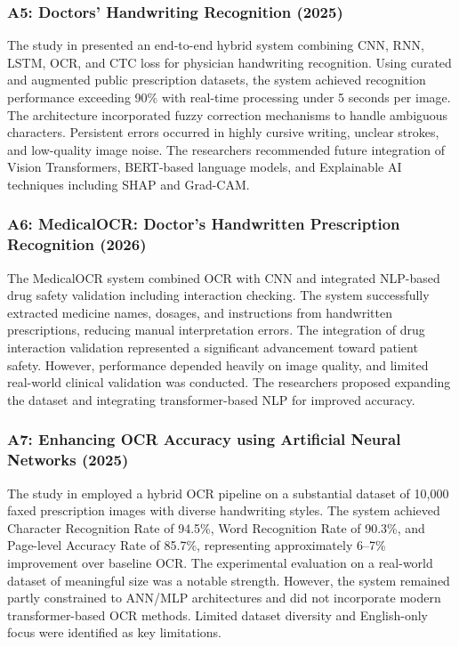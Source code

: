 \documentclass[conference]{IEEEtran}
\begin{document}
\subsubsection{A5: Doctors' Handwriting Recognition (2025)}

The study in \cite{intuitionlabs2026pharma} presented an end-to-end hybrid system combining CNN, RNN, LSTM, OCR, and CTC loss for physician handwriting recognition. Using curated and augmented public prescription datasets, the system achieved recognition performance exceeding 90\% with real-time processing under 5 seconds per image. The architecture incorporated fuzzy correction mechanisms to handle ambiguous characters. Persistent errors occurred in highly cursive writing, unclear strokes, and low-quality image noise. The researchers recommended future integration of Vision Transformers, BERT-based language models, and Explainable AI techniques including SHAP and Grad-CAM.

\subsubsection{A6: MedicalOCR: Doctor's Handwritten Prescription Recognition (2026)}

The MedicalOCR system \cite{chandra2019prescription} combined OCR with CNN and integrated NLP-based drug safety validation including interaction checking. The system successfully extracted medicine names, dosages, and instructions from handwritten prescriptions, reducing manual interpretation errors. The integration of drug interaction validation represented a significant advancement toward patient safety. However, performance depended heavily on image quality, and limited real-world clinical validation was conducted. The researchers proposed expanding the dataset and integrating transformer-based NLP for improved accuracy.

\subsubsection{A7: Enhancing OCR Accuracy using Artificial Neural Networks (2025)}

The study in \cite{srinivasa2020analysis} employed a hybrid OCR pipeline on a substantial dataset of 10,000 faxed prescription images with diverse handwriting styles. The system achieved Character Recognition Rate of 94.5\%, Word Recognition Rate of 90.3\%, and Page-level Accuracy Rate of 85.7\%, representing approximately 6--7\% improvement over baseline OCR. The experimental evaluation on a real-world dataset of meaningful size was a notable strength. However, the system remained partly constrained to ANN/MLP architectures and did not incorporate modern transformer-based OCR methods. Limited dataset diversity and English-only focus were identified as key limitations.
\end{document}
